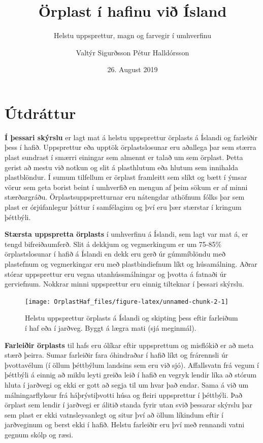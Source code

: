 \documentclass[icelandic,]{book}
\title{{Örplast í hafinu við Ísland}}
\subtitle{{ Helstu uppsprettur, magn og farvegir í umhverfinu}}
\author{{Valtýr Sigurðsson}
{Pétur Halldórsson}}
\date{26. August 2019}
\begin{document}
\maketitle

{
\setcounter{tocdepth}{1}
\tableofcontents
}
\listoftables
\listoffigures
\hypertarget{utdrattur}{%
\chapter*{Útdráttur}\label{utdrattur}}

\textbf{Í þessari skýrslu} er lagt mat á helstu uppsprettur örplasts á Íslandi og farleiðir þess í hafið. Uppsprettur eða upptök örplastslosunar eru aðallega þar sem stærra plast sundrast í smærri einingar sem almennt er talað um sem örplast. Þetta gerist að mestu við notkun og slit á plasthlutum eða hlutum sem innihalda plastblöndur. Í sumum tilfellum er örplast framleitt sem slíkt og bætt í ýmsar vörur sem geta borist beint í umhverfið en mengun af þeim sökum er af minni stærðargráðu. Örplastsuppspretturnar eru nátengdar athöfnum fólks þar sem plast er órjúfanlegur þáttur í samfélaginu og því eru þær stærstar í kringum þéttbýli.

\textbf{Stærsta uppspretta örplasts} í umhverfinu á Íslandi, sem lagt var mat á, er tengd bifreiðaumferð. Slit á dekkjum og vegmerkingum er um 75-85\% örplastslosunar í hafið á Íslandi en dekk eru gerð úr gúmmíblöndu með plastefnum og vegmerkingar eru með plastbindiefnum líkt og húsamálning. Aðrar stórar uppsprettur eru vegna utanhússmálningar og þvotta á fatnaði úr gerviefnum. Nokkrar minni uppsprettur eru einnig tilteknar í þessari skýrslu.

\begin{figure}

{\centering \texttt{[image: OrplastHaf\_files/figure-latex/unnamed-chunk-2-1]} 

}

\caption{Helstu uppsprettur örplasts á Íslandi og skipting þess eftir farleiðum í haf eða í jarðveg. Byggt á lægra mati (sjá meginmál).}\label{fig:unnamed-chunk-2}
\end{figure}

\textbf{Farleiðir örplasts} til hafs eru ólíkar eftir uppsprettum og misflókið er að meta stærð þeirra. Sumar farleiðir fara óhindraðar í hafið líkt og frárennsli úr þvottavélum (í öllum þéttbýlum landsins sem eru við sjó). Affallsvatn frá vegum í þéttbýli á einnig að miklu leyti greiða leið í hafið en vegryk lendir líka að stórum hluta í jarðvegi og ekki er gott að segja til um hvar það endar. Sama á við um málningarflyksur frá háþrýstiþvotti húsa og fleiri uppsprettur í þéttbýli. Það örplast sem lendir í jarðvegi er álitið standa fyrir utan svið þessarar skýrslu þar sem plast er ekki vatnsleysanlegt og situr því að öllum líkindum eftir í jarðveginum og berst ekki í hafið. Helstu farleiðir eru því með rennandi vatni gegnum skólp og ræsi.
\end{document}

